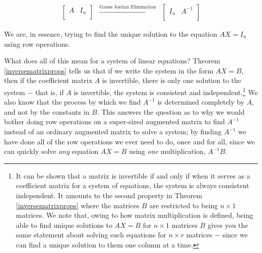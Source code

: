 \[ \begin{array}{ccc}

\left[ \begin{array}{c|c} A & I_{n} \\ \end{array} \right]

&
\xrightarrow{\text{Gauss Jordan Elimination}}

&

\left[ \begin{array}{c|c} I_{n} & A^{-1} \\ \end{array} \right] 

\end{array}\]

We are, in essence, trying to find the unique solution to the equation $AX = I_{n}$ using row operations.

\smallskip

What does all of this mean for a system of linear equations?  Theorem \ref{inversematrixprops} tells us that if we write the system in the form $AX=B$, then if the coefficient matrix $A$ is invertible, there is only one solution to the system $-$ that is, if $A$ is invertible, the system is consistent and independent.\footnote{It can be shown that a matrix is invertible if and only if when it serves as a coefficient matrix for a system of equations, the system is always consistent independent. It amounts to the second property in Theorem \ref{inversematrixprops} where the matrices $B$ are restricted to being $n \times 1$ matrices.  We note that, owing to how matrix multiplication is defined, being able to find unique solutions to $AX = B$ for $n \times 1$ matrices $B$ gives you the same statement about solving such equations for $n \times r$ matrices $-$ since we can find a unique solution to them one column at a time.}  We also know that the process by which we find $A^{-1}$ is determined completely by $A$, and not by the constants in $B$.  This answers the question as to why we would bother doing row operations on a super-sized augmented matrix to find $A^{-1}$ instead of an ordinary augmented matrix to solve a system;  by finding $A^{-1}$ we have done all of the row operations we ever need to do, once and for all, since we can quickly solve \textit{any} equation $AX = B$ using \textit{one} multiplication, $A^{-1}B$.

